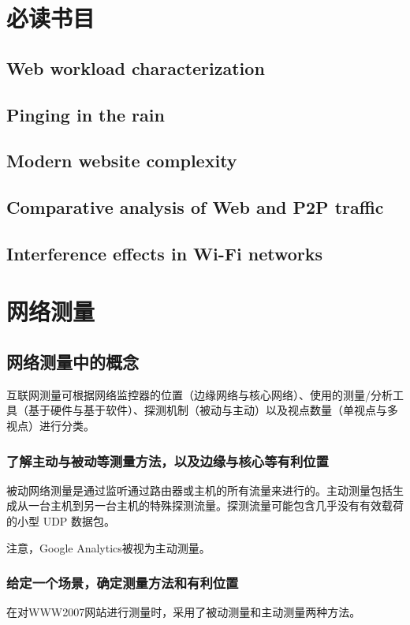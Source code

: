 \chapter*{必读书目}

\section{Web workload characterization}
\section{Pinging in the rain}
\section{Modern website complexity}
\section{Comparative analysis of Web and P2P traffic}
\section{Interference effects in Wi-Fi networks}


\chapter{网络测量}

\section{网络测量中的概念}

互联网测量可根据网络监控器的位置（边缘网络与核心网络）、使用的测量/分析工具（基于硬件与基于软件）、探测机制（被动与主动）以及视点数量（单视点与多视点）进行分类。

\subsection{了解主动与被动等测量方法，以及边缘与核心等有利位置}

被动网络测量是通过监听通过路由器或主机的所有流量来进行的。主动测量包括生成从一台主机到另一台主机的特殊探测流量。探测流量可能包含几乎没有有效载荷的小型 UDP 数据包。

注意，Google Analytics被视为主动测量。

\subsection{给定一个场景，确定测量方法和有利位置}
在对WWW2007网站进行测量时，采用了被动测量和主动测量两种方法。

